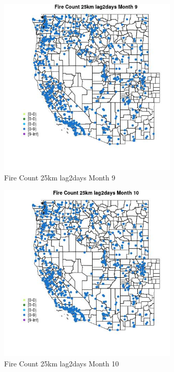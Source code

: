 \begin{figure} 
\centering  
\includegraphics[width=0.77\textwidth]{Code_Outputs/Report_ML_input_PM25_Step4_part_e_de_duplicated_aves_compiled_2019-05-21wNAs_MapObsMo9Fire_Count_25km_lag2days.jpg} 
\caption{\label{fig:Report_ML_input_PM25_Step4_part_e_de_duplicated_aves_compiled_2019-05-21wNAsMapObsMo9Fire_Count_25km_lag2days}Fire Count 25km lag2days Month 9} 
\end{figure} 
 

\begin{figure} 
\centering  
\includegraphics[width=0.77\textwidth]{Code_Outputs/Report_ML_input_PM25_Step4_part_e_de_duplicated_aves_compiled_2019-05-21wNAs_MapObsMo10Fire_Count_25km_lag2days.jpg} 
\caption{\label{fig:Report_ML_input_PM25_Step4_part_e_de_duplicated_aves_compiled_2019-05-21wNAsMapObsMo10Fire_Count_25km_lag2days}Fire Count 25km lag2days Month 10} 
\end{figure} 
 

